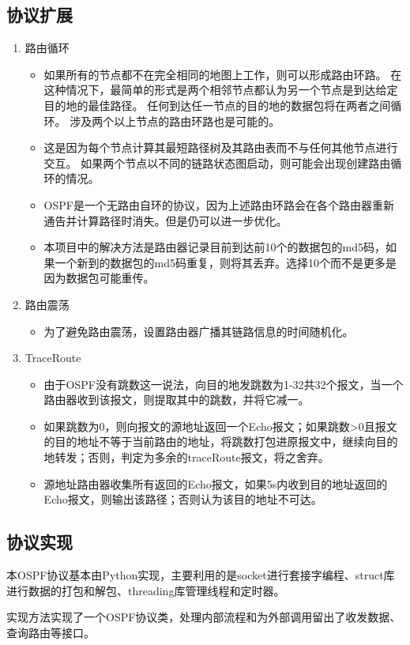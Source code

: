 	\subsection{协议扩展} %
	\label{sub:协议扩展}
		\begin{enumerate}
			\item 路由循环
				\begin{itemize}
					\item 如果所有的节点都不在完全相同的地图上工作，则可以形成路由环路。 在这种情况下，最简单的形式是两个相邻节点都认为另一个节点是到达给定目的地的最佳路径。 任何到达任一节点的目的地的数据包将在两者之间循环。 涉及两个以上节点的路由环路也是可能的。
					\item 这是因为每个节点计算其最短路径树及其路由表而不与任何其他节点进行交互。 如果两个节点以不同的链路状态图启动，则可能会出现创建路由循环的情况。
					\item OSPF是一个无路由自环的协议，因为上述路由环路会在各个路由器重新通告并计算路径时消失。但是仍可以进一步优化。
					\item 本项目中的解决方法是路由器记录目前到达前10个的数据包的md5码，如果一个新到的数据包的md5码重复，则将其丢弃。选择10个而不是更多是因为数据包可能重传。
				\end{itemize}
			\item 路由震荡
				\begin{itemize}
					\item 为了避免路由震荡，设置路由器广播其链路信息的时间随机化。
				\end{itemize}
			\item TraceRoute
				\begin{itemize}
					\item 由于OSPF没有跳数这一说法，向目的地发跳数为1-32共32个报文，当一个路由器收到该报文，则提取其中的跳数，并将它减一。
					\item 如果跳数为0，则向报文的源地址返回一个Echo报文；如果跳数>0且报文的目的地址不等于当前路由的地址，将跳数打包进原报文中，继续向目的地转发；否则，判定为多余的traceRoute报文，将之舍弃。
					\item 源地址路由器收集所有返回的Echo报文，如果5s内收到目的地址返回的Echo报文，则输出该路径；否则认为该目的地址不可达。
				\end{itemize} 
		\end{enumerate}
	\subsection{协议实现} %
	\label{sub:协议实现}
		本OSPF协议基本由Python实现，主要利用的是socket进行套接字编程、struct库进行数据的打包和解包、threading库管理线程和定时器。
		\par 实现方法实现了一个OSPF协议类，处理内部流程和为外部调用留出了收发数据、查询路由等接口。

